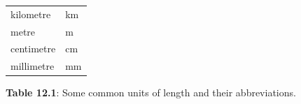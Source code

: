 {\begin{center}
\begin{xtabular*}{\mytablewidth}[t]{|p{10\mystarwidth}|p{10\mystarwidth}|}
        kilometre &
        km%
     \tabularnewline{}
        metre &
        m%
     \tabularnewline{}
        centimetre &
        cm%
     \tabularnewline{}
        millimetre &
        mm%
     \tabularnewline{}
    \end{xtabular*}
      \end{center}
    \begin{center}{\small\bfseries Table 12.1}: Some common units of length and their abbreviations.\end{center}
        }%
    \par
    \label{m39370*cid4}
